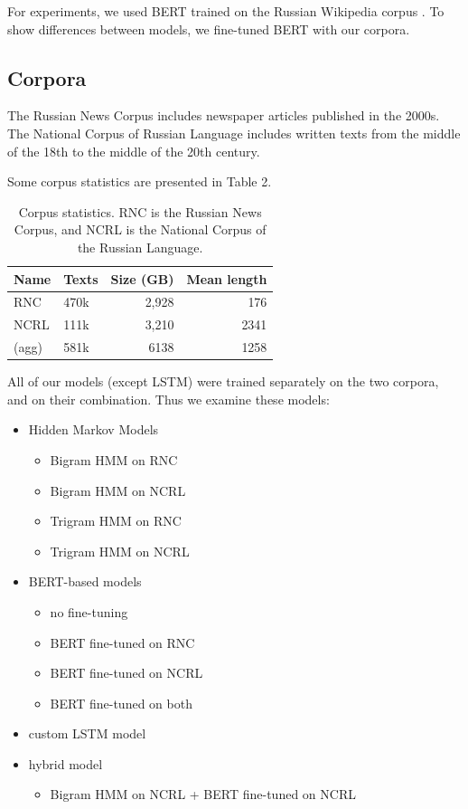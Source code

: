 \documentclass[a4paper]{article}
\begin{document}
For experiments, we used BERT trained on the Russian Wikipedia corpus
\cite{ruwiki}. To show differences between models, we fine-tuned BERT with our corpora.


\subsection{Corpora}

The Russian News Corpus \cite{runews} includes newspaper articles published in the 2000s.
The National Corpus of Russian Language \cite{natcorp} includes written texts from the middle of the 18th to the middle of the 20th century.

Some corpus statistics are presented in Table 2.

\begin{table}
\caption{Corpus statistics. RNC is the Russian News Corpus, and NCRL is the National Corpus of the Russian Language.
\newline}
\centering

\begin{tabular}{llrr}
\textbf{Name}&
\textbf{Texts} &
\textbf{Size} (GB)&
\textbf{Mean length}\\
\hline
RNC &
470k&
2,928&
176\\
NCRL &
111k &
3,210 &
2341 \\
(agg) &
581k &
6138 &
1258
\end{tabular}
\end{table}


All of our models (except LSTM) were trained separately on the two corpora, and on their combination. Thus we examine these models:

\begin{itemize}
	\item Hidden Markov Models
	\begin{itemize}
		\item Bigram HMM on RNC
		\item Bigram HMM on NCRL
		\item Trigram HMM on RNC
		\item Trigram HMM on NCRL
	\end{itemize}
	\item BERT-based models

	\begin{itemize}
		\item no fine-tuning
		\item BERT fine-tuned on RNC
		\item BERT fine-tuned on NCRL
		\item BERT fine-tuned on both
	\end{itemize}

	\item custom LSTM model
	\item hybrid model
	\begin{itemize}
		\item Bigram HMM on NCRL + BERT fine-tuned on NCRL
	\end{itemize}
\end{itemize}
\end{document}
